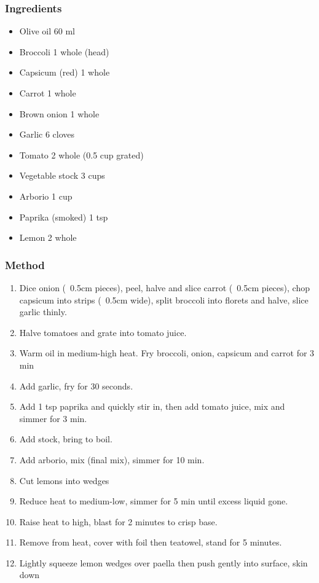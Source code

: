 \documentclass[]{article}
\begin{document}
\subsubsection*{\Large Ingredients}
\begin{multicols}{2}
\begin{itemize}
 \item Olive oil \hfill 60 ml
 \item Broccoli \hfill 1 whole (head)
 \item Capsicum (red) \hfill 1 whole
 \item Carrot \hfill 1 whole
 \item Brown onion \hfill 1 whole
 \item Garlic \hfill 6 cloves
 \item Tomato \hfill 2 whole (0.5 cup grated)
 \item Vegetable stock \hfill 3 cups
 \item Arborio \hfill 1 cup
 \item Paprika (smoked) \hfill 1 tsp
 \item Lemon \hfill 2 whole
\end{itemize}
\end{multicols}
\subsubsection*{\Large Method}
\begin{enumerate}[font=\huge\color{accent}]
	\item Dice onion (~0.5cm pieces), peel, halve and slice carrot (~0.5cm pieces), chop capsicum into strips (~0.5cm wide), split broccoli into florets and halve, slice garlic thinly.
	\item Halve tomatoes and grate into tomato juice.
	\item Warm oil in medium-high heat. Fry broccoli, onion, capsicum and carrot for 3 min
	\item Add garlic, fry for 30 seconds.
	\item Add 1 tsp paprika and quickly stir in, then add tomato juice, mix and simmer for 3 min.
	\item Add stock, bring to boil.
	\item Add arborio, mix (final mix), simmer for 10 min.
	\item Cut lemons into wedges
	\item Reduce heat to medium-low, simmer for 5 min until excess liquid gone.
	\item Raise heat to high, blast for 2 minutes to crisp base.
	\item Remove from heat, cover with foil then teatowel, stand for 5 minutes.
	\item Lightly squeeze lemon wedges over paella then push gently into surface, skin down
\end{enumerate}
\newpage
{}\label{rec:Caramelised Onion and Tomato Risotto}
\end{document}
